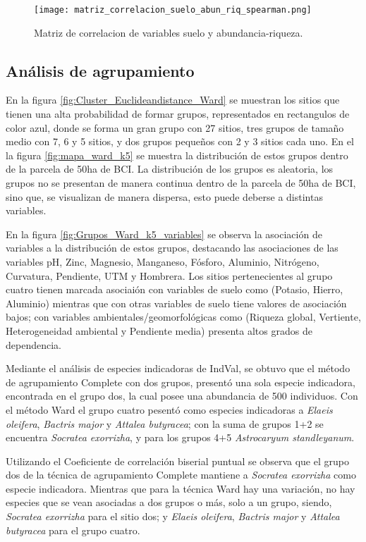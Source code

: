 \documentclass[11pt,]{article}
\begin{document}
\begin{figure}
\centering
\texttt{[image: matriz\_correlacion\_suelo\_abun\_riq\_spearman.png]}
\caption{Matriz de correlacion de variables suelo y abundancia-riqueza.
\label{fig:matriz_correlacion_suelo_abun_riq_spearman}}
\end{figure}

\subsection{Análisis de agrupamiento}\label{anuxe1lisis-de-agrupamiento}

En la figura \ref{fig:Cluster_Euclideandistance_Ward} se muestran los
sitios que tienen una alta probabilidad de formar grupos, representados
en rectangulos de color azul, donde se forma un gran grupo con 27
sitios, tres grupos de tamaño medio con 7, 6 y 5 sitios, y dos grupos
pequeños con 2 y 3 sitios cada uno. En el la figura
\ref{fig:mapa_ward_k5} se muestra la distribución de estos grupos dentro
de la parcela de 50ha de BCI. La distribución de los grupos es
aleatoria, los grupos no se presentan de manera continua dentro de la
parcela de 50ha de BCI, sino que, se visualizan de manera dispersa, esto
puede deberse a distintas variables.

En la figura \ref{fig:Grupos_Ward_k5_variables} se observa la asociación
de variables a la distribución de estos grupos, destacando las
asociaciones de las variables pH, Zinc, Magnesio, Manganeso, Fósforo,
Aluminio, Nitrógeno, Curvatura, Pendiente, UTM y Hombrera. Los sitios
pertenecientes al grupo cuatro tienen marcada asociaión con variables de
suelo como (Potasio, Hierro, Aluminio) mientras que con otras variables
de suelo tiene valores de asociación bajos; con variables
ambientales/geomorfológicas como (Riqueza global, Vertiente,
Heterogeneidad ambiental y Pendiente media) presenta altos grados de
dependencia.

Mediante el análisis de especies indicadoras de IndVal, se obtuvo que el
método de agrupamiento Complete con dos grupos, presentó una sola
especie indicadora, encontrada en el grupo dos, la cual posee una
abundancia de 500 individuos. Con el método Ward el grupo cuatro pesentó
como especies indicadoras a \emph{Elaeis oleifera}, \emph{Bactris major}
y \emph{Attalea butyracea}; con la suma de grupos 1+2 se encuentra
\emph{Socratea exorrizha}, y para los grupos 4+5 \emph{Astrocaryum
standleyanum}.

Utilizando el Coeficiente de correlación biserial puntual se observa que
el grupo dos de la técnica de agrupamiento Complete mantiene a
\emph{Socratea exorrizha} como especie indicadora. Mientras que para la
técnica Ward hay una variación, no hay especies que se vean asociadas a
dos grupos o más, solo a un grupo, siendo, \emph{Socratea exorrizha}
para el sitio dos; y \emph{Elaeis oleifera}, \emph{Bactris major} y
\emph{Attalea butyracea} para el grupo cuatro.
\end{document}

